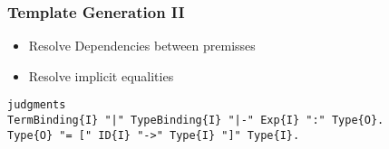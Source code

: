 \documentclass{beamer}
\begin{document}
\begin{frame}[fragile]
  \frametitle{Template Generation II}
\begin{itemize}
\item Resolve Dependencies between premisses
\item Resolve implicit equalities
\end{itemize}

\begin{lstlisting}
judgments
TermBinding{I} "|" TypeBinding{I} "|-" Exp{I} ":" Type{O}.
Type{O} "= [" ID{I} "->" Type{I} "]" Type{I}.
\end{lstlisting}

\end{frame}

\renewcommand*\selectTemplateOptimization{orange}
\renewcommand*\selectTemplateOptimization{}
\end{document}
